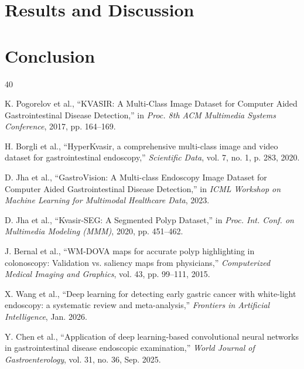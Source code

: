 \documentclass[conference]{IEEEtran}
\begin{document}
\section{Results and Discussion}
\label{sec:results}


\section{Conclusion}
\label{sec:conclusion}


\begin{thebibliography}{40}

K. Pogorelov et al., ``KVASIR: A Multi-Class Image Dataset for Computer Aided Gastrointestinal Disease Detection,'' in \emph{Proc. 8th ACM Multimedia Systems Conference}, 2017, pp. 164--169.

H. Borgli et al., ``HyperKvasir, a comprehensive multi-class image and video dataset for gastrointestinal endoscopy,'' \emph{Scientific Data}, vol. 7, no. 1, p. 283, 2020.

D. Jha et al., ``GastroVision: A Multi-class Endoscopy Image Dataset for Computer Aided Gastrointestinal Disease Detection,'' in \emph{ICML Workshop on Machine Learning for Multimodal Healthcare Data}, 2023.

D. Jha et al., ``Kvasir-SEG: A Segmented Polyp Dataset,'' in \emph{Proc. Int. Conf. on Multimedia Modeling (MMM)}, 2020, pp. 451--462.

J. Bernal et al., ``WM-DOVA maps for accurate polyp highlighting in colonoscopy: Validation vs. saliency maps from physicians,'' \emph{Computerized Medical Imaging and Graphics}, vol. 43, pp. 99--111, 2015.

X. Wang et al., ``Deep learning for detecting early gastric cancer with white-light endoscopy: a systematic review and meta-analysis,'' \emph{Frontiers in Artificial Intelligence}, Jan. 2026.

Y. Chen et al., ``Application of deep learning-based convolutional neural networks in gastrointestinal disease endoscopic examination,'' \emph{World Journal of Gastroenterology}, vol. 31, no. 36, Sep. 2025.


\end{thebibliography}
\end{document}

